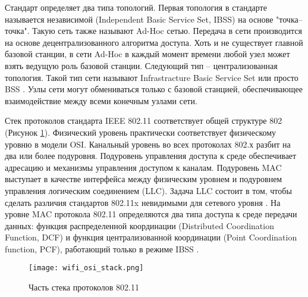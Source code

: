 Стандарт определяет два типа топологий. Первая топология в стандарте называется независимой (Independent Basic Service Set, IBSS) на основе "точка-- точка". Такую сеть также называют Ad-Hoc сетью. Передача в сети производится на основе децентрализованного алгоритма доступа. Хоть и не существует главной базовой станции, в сети Ad-Hoc в каждый момент времени любой узел может взять ведущую роль базовой станции. Следующий тип -- централизованная топология. Такой тип сети называют Infrastracture  Basic Service Set или просто BSS \cite{Olifer2020}. Узлы сети могут обмениваться только с базовой станцией, обеспечивающее взаимодействие между всеми конечным узлами сети. 
 
Стек протоколов стандарта IEEE 802.11 соответствует общей структуре 802 (Рисунок \cref{fig:part1_wifi_osi_stack}). Физический уровень практически соответствует физическому уровню в модели OSI. Канальный уровень во всех протоколах 802.х разбит на два или более подуровня.  Подуровень управления доступа к среде обеспечивает адресацию и механизмы управления доступом к каналам. Подуровень MAC выступает в качестве интерфейса между физическим уровнем и подуровнем управления логическим соединением (LLC). Задача LLC состоит в том, чтобы сделать различия стандартов 802.11x невидимыми для сетевого уровня \cite{Tanenbaum2022}. На уровне MAC протокола 802.11 определяются два типа доступа к среде передачи данных: функция распределенной координации (Distributed Coordination Function, DCF) и функция централизованной координации (Point Coordination function, PCF), работающий только в режиме IBSS \cite{802.11WG-WirelessLANWorkingGroup2020}.


\begin{figure}[h!]
  \centering
   \texttt{[image: wifi\_osi\_stack.png]}
\caption{Часть стека протоколов 802.11}
\label{fig:part1_wifi_osi_stack}
\end{figure}

